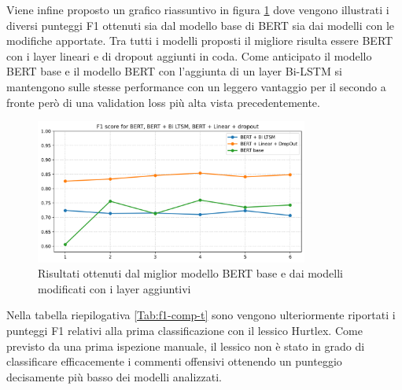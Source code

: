     Viene infine proposto un grafico riassuntivo in figura \ref{fig:f1-comp-f} dove vengono illustrati i diversi punteggi F1 ottenuti sia dal modello base di BERT sia dai modelli con le modifiche apportate. Tra tutti i modelli proposti il migliore risulta essere BERT con i layer lineari e di dropout aggiunti in coda. Come anticipato il modello BERT base e il modello BERT con l'aggiunta di un layer Bi-LSTM si mantengono sulle stesse performance con un leggero vantaggio per il secondo a fronte però di una validation loss più alta vista precedentemente.
    
    
    \begin{figure}[h]
        \centering
        \includegraphics[width=0.8\textwidth]{pics/modifiche bert/F1 BERT Bi LSTM Linear stretched.png}
        \caption{Risultati ottenuti dal miglior modello BERT base e dai modelli modificati con i layer aggiuntivi}
        \label{fig:f1-comp-f}
    \end{figure}
    
    
    Nella tabella riepilogativa \ref{Tab:f1-comp-t} sono vengono ulteriormente riportati i punteggi F1 relativi alla prima classificazione con il lessico Hurtlex. Come previsto da una prima ispezione manuale, il lessico non è stato in grado di classificare efficacemente i commenti offensivi ottenendo un punteggio decisamente più basso dei modelli analizzati.
    
